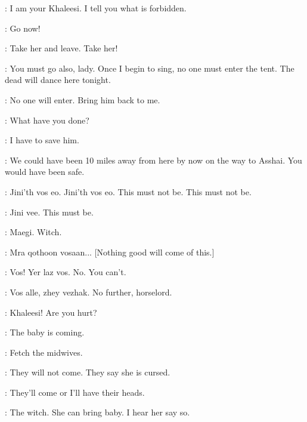 \DAENERYS: I am your Khaleesi. I tell you what is forbidden. 

\MIRRI: Go now! 

\DAENERYS:  Take her and leave. Take her! 


\MIRRI: You must go also, lady. Once I begin to sing, no one must enter the tent. The dead will dance here tonight. 

\DAENERYS: No one will enter.  Bring him back to me. 


\JORAH: What have you done? 

\DAENERYS: I have to save him. 

\JORAH: We could have been 10 miles away from here by now on the way to Asshai.  You would have been safe. 

\QOTHO:  Jini'th vos eo. Jini'th vos eo. This must not be. This must not be. 

\DAENERYS: Jini vee. This must be. 

\QOTHO: Maegi. Witch. 

\RAKHARO:  Mra qothoon vosaan... [Nothing good will come of this.] 


\DAENERYS:  Vos! Yer laz vos. No. You can't.

\JORAH: Vos alle, zhey vezhak. No further, horselord. 


\JORAH: Khaleesi! Are you hurt? 

\DAENERYS: The baby is coming. 

\JORAH: Fetch the midwives. 

\RAKHARO: They will not come. They say she is cursed. 

\JORAH: They'll come or I'll have their heads. 

\RAKHARO: The witch. She can bring baby. I hear her say so. 



